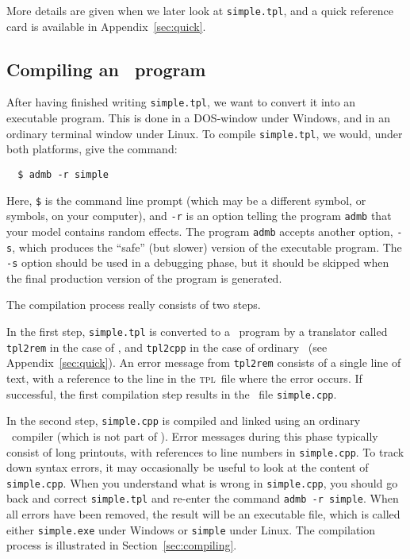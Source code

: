 \documentclass{admbmanual}
\begin{document}
More details are given when we later look at \texttt{simple.tpl}, and a quick
reference card is available in Appendix~\ref{sec:quick}.

\subsection{Compiling an \scAB\ program}

After having finished writing \texttt{simple.tpl}, we want to convert it into an
executable program. This is done in a \textsc{DOS}-window under Windows, and in
an ordinary terminal window under Linux. To compile \texttt{simple.tpl}, we
would, under both platforms, give the command:
\begin{lstlisting}
  $ admb -r simple
\end{lstlisting}
Here, \texttt{\$} is the command line prompt (which may be a different symbol,
or symbols, on your computer), and \texttt{-r} is an option telling the program
\texttt{admb} that your model contains random effects. The program \texttt{admb}
accepts another option, \texttt{-s}, which produces the ``safe'' (but slower)
version of the executable program. The \texttt{-s} option should be used in a
debugging phase, but it should be skipped when the final production version of
the program is generated.

The compilation process really consists of two steps.

In the first step, \texttt{simple.tpl} is converted to a \cplus\ program by a
translator called \texttt{tpl2rem} in the case of \scAR, and \texttt{tpl2cpp}
in the case of ordinary \scAB\ (see Appendix~\ref{sec:quick}). An error message
from \texttt{tpl2rem} consists of a single line of text, with a reference to the
line in the \textsc{tpl}~file where the error occurs. If successful, the first
compilation step results in the \cplus\ file \texttt{simple.cpp}.

In the second step, \texttt{simple.cpp} is compiled and linked using an ordinary
\cplus\ compiler (which is not part of \scAB). Error messages during this phase
typically consist of long printouts, with references to line numbers in
\texttt{simple.cpp}. To track down syntax errors, it may occasionally be useful
to look at the content of \texttt{simple.cpp}. When you understand what is wrong
in \texttt{simple.cpp}, you should go back and correct \texttt{simple.tpl} and
re-enter the command \texttt{admb -r simple}. When all errors have been removed,
the result will be an executable file, which is called either
\texttt{simple.exe} under Windows or \texttt{simple} under Linux. The
compilation process is illustrated in Section~\ref{sec:compiling}.
\end{document}
